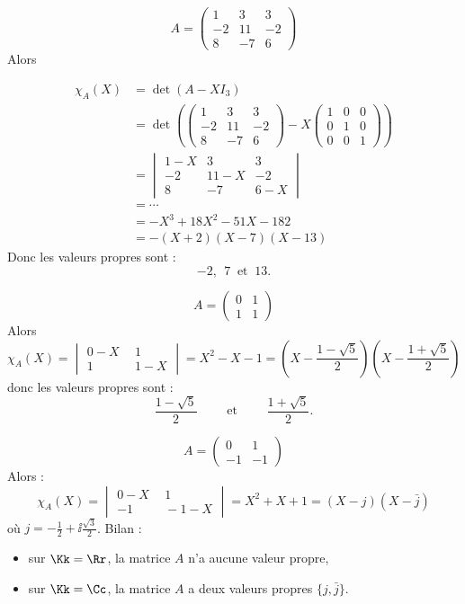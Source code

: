 \documentclass[11pt, class=report,crop=false]{standalone}
\begin{document}
\begin{exemple}
$$A = \begin{pmatrix}
1 & 3 & 3 \\
-2 & 11 & -2 \\
8 & -7 & 6
\end{pmatrix}$$
Alors 

\begin{align*}
\chi_A(X) 
 & = \det(A-XI_3) \\ 
 & =  \det \left(
\begin{pmatrix}
1 & 3 & 3 \\
-2 & 11 & -2 \\
8 & -7 & 6
\end{pmatrix}
- X 
\begin{pmatrix}
1 & 0 & 0 \\
0 & 1 & 0 \\
0 & 0 & 1
\end{pmatrix}
\right) \\
 & = \begin{vmatrix}
1-X & 3 & 3 \\
-2 & 11-X & -2 \\
8 & -7 & 6-X
\end{vmatrix} \\
 & = \cdots \\
 & = -X^3 + 18X^2 -51X - 182 \\
 & = -(X+2)(X-7)(X-13)
 \end{align*}
Donc les valeurs propres sont :
$$-2, \ \ 7\  \text{ et }\  13.$$ 
\end{exemple}

\begin{exemple}
$$A = \begin{pmatrix}0 & 1\\1 &1\end{pmatrix}$$
Alors 
\[\chi_A(X) 
= \begin{vmatrix}0-X\  & \ 1\\1\  & \ 1-X\end{vmatrix}
= X^2 -X -1 
= \left(X-\frac{1-\sqrt{5}}{2}\right)\left(X-\frac{1+\sqrt{5}}{2}\right)\]
donc les valeurs propres sont :
$$\frac{1-\sqrt{5}}{2} \qquad \text{ et } \qquad \frac{1+\sqrt{5}}{2}.$$ 
\end{exemple}


\begin{exemple}
$$A = \begin{pmatrix}0 & 1\\-1 &-1\end{pmatrix}$$
Alors :
\[\chi_A(X) 
= \begin{vmatrix}0-X\  & \ 1\\-1\  & \ -1 -X\end{vmatrix}
= X^2 + X +1 
= (X-j)(X-\bar j)\]
où $j = -\frac{1}{2}+\ii\frac{\sqrt{3}}{2}$. 
Bilan :
\begin{itemize}
  \item sur $\Kk = \Rr$, la matrice $A$ n'a aucune valeur propre,
  \item sur $\Kk = \Cc$, la matrice $A$ a deux valeurs propres $\{j, \bar j\}$. 
\end{itemize}
\end{exemple}
\end{document}
